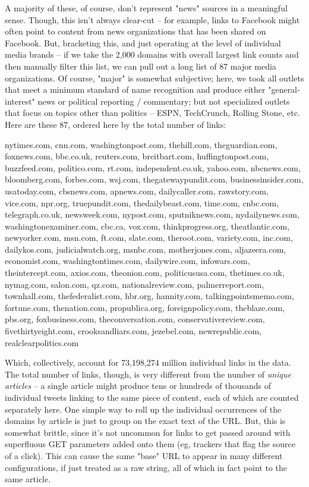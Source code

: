 \documentclass{scrartcl}
\begin{document}
A majority of these, of course, don't represent "news" sources in a meaningful sense. Though, this isn't always clear-cut -- for example, links to Facebook might often point to content from news organizations that has been shared on Facebook. But, bracketing this, and just operating at the level of individual media brands -- if we take the 2,000 domains with overall largest link counts and then manually filter this list, we can pull out a long list of 87 major media organizations. Of course, "major" is somewhat subjective; here, we took all outlets that meet a minimum standard of name recognition and produce either "general-interest" news or political reporting / commentary; but not specialized outlets that focus on topics other than politics -- ESPN, TechCrunch, Rolling Stone, etc. Here are these 87, ordered here by the total number of links:

\begin{displayquote}
\scriptsize \raggedright nytimes.com, cnn.com, washingtonpost.com, thehill.com, theguardian.com, foxnews.com, bbc.co.uk, reuters.com, breitbart.com, huffingtonpost.com, buzzfeed.com, politico.com, rt.com, independent.co.uk, yahoo.com, nbcnews.com, bloomberg.com, forbes.com, wsj.com, thegatewaypundit.com, businessinsider.com, usatoday.com, cbsnews.com, apnews.com, dailycaller.com, rawstory.com, vice.com, npr.org, truepundit.com, thedailybeast.com, time.com, cnbc.com, telegraph.co.uk, newsweek.com, nypost.com, sputniknews.com, nydailynews.com, washingtonexaminer.com, cbc.ca, vox.com, thinkprogress.org, theatlantic.com, newyorker.com, msn.com, ft.com, slate.com, theroot.com, variety.com, inc.com, dailykos.com, judicialwatch.org, msnbc.com, motherjones.com, aljazeera.com, economist.com, washingtontimes.com, dailywire.com, infowars.com, theintercept.com, axios.com, theonion.com, politicususa.com, thetimes.co.uk, nymag.com, salon.com, qz.com, nationalreview.com, palmerreport.com, townhall.com, thefederalist.com, hbr.org, hannity.com, talkingpointsmemo.com, fortune.com, thenation.com, propublica.org, foreignpolicy.com, theblaze.com, pbs.org, foxbusiness.com, theconversation.com, conservativereview.com, fivethirtyeight.com, crooksandliars.com, jezebel.com, newrepublic.com, realclearpolitics.com
\end{displayquote}


Which, collectively, account for 73,198,274 million individual links in the data. The total number of links, though, is very different from the number of \textit{unique articles} -- a single article might produce tens or hundreds of thousands of individual tweets linking to the same piece of content, each of which are counted separately here. One simple way to roll up the individual occurrences of the domains by article is just to group on the exact text of the URL. But, this is somewhat brittle, since it's not uncommon for links to get passed around with superfluous GET parameters added onto them (eg, trackers that flag the source of a click). This can cause the same "base" URL to appear in many different configurations, if just treated as a raw string, all of which in fact point to the same article.
\end{document}
